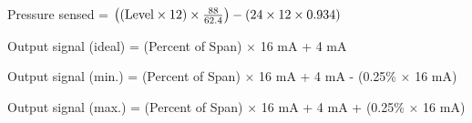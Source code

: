 \vskip 10pt

Pressure sensed = $\left( (\hbox{Level} \times 12) \times {88 \over 62.4} \right) - (24 \times 12 \times 0.934)$

\vskip 10pt

Output signal (ideal) = (Percent of Span) $\times$ 16 mA + 4 mA 

\vskip 10pt

Output signal (min.) = (Percent of Span) $\times$ 16 mA + 4 mA - (0.25\% $\times$ 16 mA) 

\vskip 10pt

Output signal (max.) = (Percent of Span) $\times$ 16 mA + 4 mA + (0.25\% $\times$ 16 mA) 

\vskip 10pt






